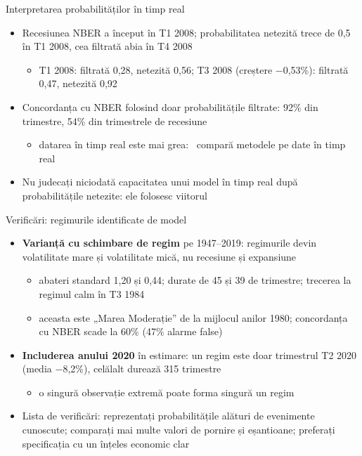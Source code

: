 \begin{frame}{Interpretarea probabilităților în timp real}
\itemsize{\small}
\begin{itemize}
    \item Recesiunea NBER a început în T1 2008; probabilitatea netezită trece de 0,5 în T1 2008, cea filtrată abia în T4 2008
    \begin{itemize}
        \item T1 2008: filtrată 0{,}28, netezită 0{,}56; T3 2008 (creștere \ensuremath{-}0{,}53\%): filtrată 0{,}47, netezită 0{,}92
    \end{itemize}
    \item Concordanța cu NBER folosind doar probabilitățile filtrate: 92\% din trimestre, 54\% din trimestrele de recesiune
    \begin{itemize}
        \item datarea în timp real este mai grea: \ compară metodele pe date în timp real
    \end{itemize}
    \item Nu judecați niciodată capacitatea unui model în timp real după probabilitățile netezite: ele folosesc viitorul
\end{itemize}
\end{frame}

\begin{frame}{Verificări: regimurile identificate de model}
\itemsize{\small}
\begin{itemize}
    \item \textbf{Varianță cu schimbare de regim} pe 1947--2019: regimurile devin volatilitate mare și volatilitate mică, nu recesiune și expansiune
    \begin{itemize}
        \item abateri standard 1{,}20 și 0{,}44; durate de 45 și 39 de trimestre; trecerea la regimul calm în T3 1984
        \item aceasta este „Marea Moderație” de la mijlocul anilor 1980; concordanța cu NBER scade la 60\% (47\% alarme false)
    \end{itemize}
    \item \textbf{Includerea anului 2020} în estimare: un regim este doar trimestrul T2 2020 (media \ensuremath{-}8{,}2\%), celălalt durează 315 trimestre
    \begin{itemize}
        \item o singură observație extremă poate forma singură un regim
    \end{itemize}
    \item Lista de verificări: reprezentați probabilitățile alături de evenimente cunoscute; comparați mai multe valori de pornire și eșantioane; preferați specificația cu un înțeles economic clar
\end{itemize}
\end{frame}

